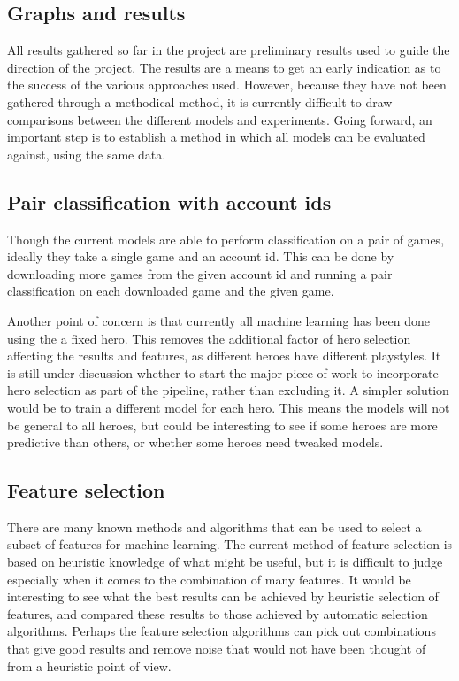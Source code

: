 \documentclass{SizheArticle}
\begin{document}
\subsection{Graphs and results}
All results gathered so far in the project are preliminary results used to guide the direction of the project. The results are a means to get an early indication as to the success of the various approaches used. However, because they have not been gathered through a methodical method, it is currently difficult to draw comparisons between the different models and experiments. Going forward, an important step is to establish a method in which all models can be evaluated against, using the same data.

\subsection{Pair classification with account ids}
Though the current models are able to perform classification on a pair of games, ideally  they take a single game and an account id. This can be done by downloading more games from the given account id and running a pair classification on each downloaded game and the given game. 

Another point of concern is that currently all machine learning has been done using the a fixed hero. This removes the additional factor of hero selection affecting the results and features, as different heroes have different playstyles. It is still under discussion whether to start the major piece of work to incorporate hero selection as part of the pipeline, rather than excluding it. A simpler solution would be to train a different model for each hero. This means the models will not be general to all heroes, but could be interesting to see if some heroes are more predictive than others, or whether some heroes need tweaked models. 

\subsection{Feature selection}
There are many known methods and algorithms that can be used to select a subset of features for machine learning. The current method of feature selection is based on heuristic knowledge of what might be useful, but it is difficult to judge especially when it comes to the combination of many features. It would be interesting to see what the best results can be achieved by heuristic selection of features, and compared these results to those achieved by automatic selection algorithms. Perhaps the feature selection algorithms can pick out combinations that give good results and remove noise that would not have been thought of from a heuristic point of view. 

\printbibliography
\end{document}
